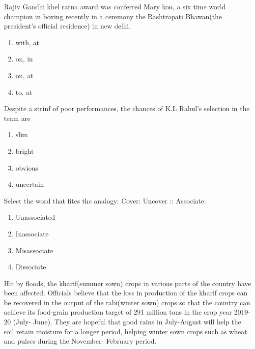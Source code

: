     \item \label{q1}  Rajiv Gandhi khel ratna award was conferred \underline{\hspace{2cm}}Mary kon, a six time world champion in boxing recently in a ceremony \underline{\hspace{2cm}} the Rashtrapati Bhawan(the president's official residence) in new delhi.
    \begin{enumerate}
        \item with, at
        \item on, in
        \item on, at
        \item to, at
    \end{enumerate}

    \item Despite a strinf of poor performances, the chances of K.L Rahul's selection in the team are\underline{\hspace{2cm}}
    \begin{enumerate}
        \item slim
        \item bright
        \item obvious
        \item uncertain
    \end{enumerate}

    \item Select the word that fites the analogy:
    Cover: Uncover :: Associate: \underline{\hspace{2cm}}
    \begin{enumerate}
        \item Unassociated
        \item Inassociate
        \item Misassociate
        \item Dissociate
    \end{enumerate}

    \item Hit by floods, the kharif(summer sown) crops in various parts of the country have been affected. Officials believe that the loss in production of the kharif crops can be recovered in the output of the rabi(winter sown) crops so that the country can achieve its food-grain production target of 291 million tons in the crop year 2019-20 (July- June). They are hopeful that good rains in July-August will help the soil retain moisture for a longer period, helping winter sown crops such as wheat and pulses during the November- February period.


